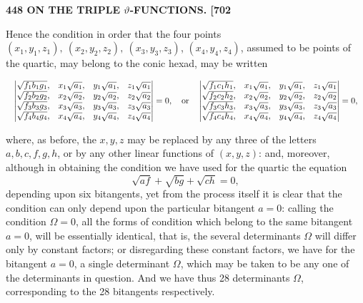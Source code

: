 \documentclass[11pt]{article}
\begin{document}
\bigskip
\noindent\textbf{448 \hfill ON THE TRIPLE $\vartheta$-FUNCTIONS. \hfill [702}

\medskip

Hence the condition in order that the four points $(x_1, y_1, z_1),\ (x_2, y_2, z_2),\ (x_3, y_3, z_3)$, $(x_4, y_4, z_4)$, assumed to be points of the quartic, may belong to the conic hexad, may be written

\[
\resizebox{\textwidth}{!}{$\displaystyle
\begin{vmatrix}
\sqrt{f_1 b_1 g_1}, & x_1\sqrt{a_1}, & y_1\sqrt{a_1}, & z_1\sqrt{a_1} \\
\sqrt{f_2 b_2 g_2}, & x_2\sqrt{a_2}, & y_2\sqrt{a_2}, & z_2\sqrt{a_2} \\
\sqrt{f_3 b_3 g_3}, & x_3\sqrt{a_3}, & y_3\sqrt{a_3}, & z_3\sqrt{a_3} \\
\sqrt{f_4 b_4 g_4}, & x_4\sqrt{a_4}, & y_4\sqrt{a_4}, & z_4\sqrt{a_4}
\end{vmatrix} = 0,
\quad\text{or}\quad
\begin{vmatrix}
\sqrt{f_1 c_1 h_1}, & x_1\sqrt{a_1}, & y_1\sqrt{a_1}, & z_1\sqrt{a_1} \\
\sqrt{f_2 c_2 h_2}, & x_2\sqrt{a_2}, & y_2\sqrt{a_2}, & z_2\sqrt{a_2} \\
\sqrt{f_3 c_3 h_3}, & x_3\sqrt{a_3}, & y_3\sqrt{a_3}, & z_3\sqrt{a_3} \\
\sqrt{f_4 c_4 h_4}, & x_4\sqrt{a_4}, & y_4\sqrt{a_4}, & z_4\sqrt{a_4}
\end{vmatrix} = 0,
$}
\]

where, as before, the $x, y, z$ may be replaced by any three of the letters $a, b, c, f, g, h$, or by any other linear functions of $(x, y, z)$: and, moreover, although in obtaining the condition we have used for the quartic the equation
\[
\sqrt{af} + \sqrt{bg} + \sqrt{ch} = 0,
\]
depending upon six bitangents, yet from the process itself it is clear that the condition can only depend upon the particular bitangent $a = 0$: calling the condition $\Omega = 0$, all the forms of condition which belong to the same bitangent $a = 0$, will be essentially identical, that is, the several determinants $\Omega$ will differ only by constant factors; or disregarding these constant factors, we have for the bitangent $a = 0$, a single determinant $\Omega$, which may be taken to be any one of the determinants in question. And we have thus 28 determinants $\Omega$, corresponding to the 28 bitangents respectively.
\end{document}
